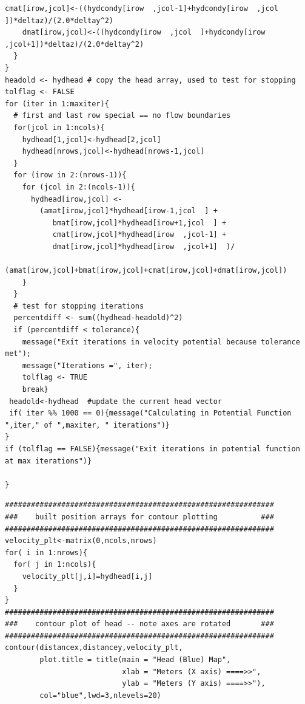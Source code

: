 \begin{lstlisting}[caption= 2D Steady Confined Aquifer Flow Script , label=lst:2DinclusionHead]
    cmat[irow,jcol]<-((hydcondy[irow  ,jcol-1]+hydcondy[irow  ,jcol  ])*deltaz)/(2.0*deltay^2)
    dmat[irow,jcol]<-((hydcondy[irow  ,jcol  ]+hydcondy[irow  ,jcol+1])*deltaz)/(2.0*deltay^2)
  }
}
headold <- hydhead # copy the head array, used to test for stopping 
tolflag <- FALSE
for (iter in 1:maxiter){
  # first and last row special == no flow boundaries
  for(jcol in 1:ncols){
    hydhead[1,jcol]<-hydhead[2,jcol]
    hydhead[nrows,jcol]<-hydhead[nrows-1,jcol]
  }
  for (irow in 2:(nrows-1)){
    for (jcol in 2:(ncols-1)){
      hydhead[irow,jcol] <- 
        (amat[irow,jcol]*hydhead[irow-1,jcol  ] +
           bmat[irow,jcol]*hydhead[irow+1,jcol  ] +
           cmat[irow,jcol]*hydhead[irow  ,jcol-1] +
           dmat[irow,jcol]*hydhead[irow  ,jcol+1]  )/
        (amat[irow,jcol]+bmat[irow,jcol]+cmat[irow,jcol]+dmat[irow,jcol])
    }
  }
  # test for stopping iterations
  percentdiff <- sum((hydhead-headold)^2)
  if (percentdiff < tolerance){
    message("Exit iterations in velocity potential because tolerance met");
    message("Iterations =", iter);
    tolflag <- TRUE
    break}
 headold<-hydhead  #update the current head vector
 if( iter %% 1000 == 0){message("Calculating in Potential Function ",iter," of ",maxiter, " iterations")}
}
if (tolflag == FALSE){message("Exit iterations in potential function at max iterations")}

}\end{lstlisting}

\begin{lstlisting}[caption= Contour plotting script , label=lst:2DinclusionHeadPlot]
##############################################################
###    built position arrays for contour plotting          ###
##############################################################
velocity_plt<-matrix(0,ncols,nrows) 
for( i in 1:nrows){
  for( j in 1:ncols){
    velocity_plt[j,i]=hydhead[i,j]
  }
}
##############################################################
###    contour plot of head -- note axes are rotated       ###
##############################################################
contour(distancex,distancey,velocity_plt,
        plot.title = title(main = "Head (Blue) Map",
                           xlab = "Meters (X axis) ====>>", 
                           ylab = "Meters (Y axis) ====>>"),
        col="blue",lwd=3,nlevels=20)
\end{lstlisting}

